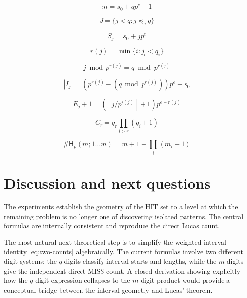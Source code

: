\documentclass[11pt,a4paper]{article}
\theoremstyle{definition}
\theoremstyle{remark}
\newcommand{\hit}{\mathsf{H}}
\newcommand{\floor}[1]{\left\lfloor #1\right\rfloor}
\begin{document}
\begin{equation}
\boxed{
 m=s_0+qp^e-1
}
\end{equation}

\begin{equation}
\boxed{
 J=\{j<q:j\preceq_p q\}
}
\end{equation}

\begin{equation}
\boxed{
 S_j=s_0+jp^e
}
\end{equation}

\begin{equation}
\boxed{
 r(j)=\min\{i:j_i<q_i\}
}
\end{equation}

\begin{equation}
\boxed{
 j\bmod p^{r(j)}=q\bmod p^{r(j)}
}
\end{equation}

\begin{equation}
\boxed{
 |I_j|=
 \left(p^{r(j)}-(q\bmod p^{r(j)})\right)p^e-s_0
}
\end{equation}

\begin{equation}
\boxed{
 E_j+1
 =
 \left(\floor{j/p^{r(j)}}+1\right)p^{e+r(j)}
}
\end{equation}

\begin{equation}
\boxed{
 C_r=q_r\prod_{i>r}(q_i+1)
}
\end{equation}

\begin{equation}
\boxed{
 \#\hit_p(m;1\ldots m)
 =
 m+1-\prod_i(m_i+1)
}
\end{equation}

\section{Discussion and next questions}

The experiments establish the geometry of the HIT set to a level at which the remaining problem is no longer one of discovering isolated patterns.  The central formulas are internally consistent and reproduce the direct Lucas count.

The most natural next theoretical step is to simplify the weighted interval identity
\eqref{eq:two-counts} algebraically.  The current formulas involve two different digit systems: the $q$-digits classify interval starts and lengths, while the $m$-digits give the independent direct MISS count.  A closed derivation showing explicitly how the $q$-digit expression collapses to the $m$-digit product would provide a conceptual bridge between the interval geometry and Lucas' theorem.
\end{document}
